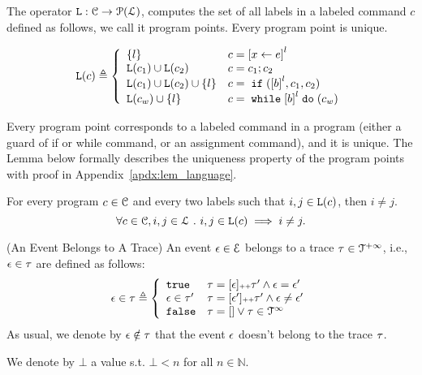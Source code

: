 The operator $\mathtt{L}: \mathcal{C} \to \mathcal{P}(\mathcal{L})$,
computes the set of all labels
in a labeled command $c$ defined as follows, we call it program points.
Every program point is unique.
\begin{defn}
\label{def:progl}
{\small
\[
 \progl(c) \triangleq
 \left\{
 \begin{array}{ll}
 \{l\} 
 & {c} = \clabel{\assign x \expr}^{l} 
 \\
 \progl({c_1}) \cup \progl({{c_2}}) 
 & {c} = {c_1};{c_2}
 \\
 \progl(c_1) \cup \progl({{c_2}}) \cup \{l\} 
 & {c} =\eif(\clabel{\bexpr}^{l}, c_1, c_2) 
 \\
 \progl(c_w) \cup \{l\} 
 & {c} = \ewhile \clabel{\bexpr}^{l} \edo (c_w)
\end{array}
\right.
\]
}
\end{defn}
%
Every program point corresponds to a labeled command in a program (either a guard of if or while command, or an assignment command), and it is unique.
The Lemma below formally describes the uniqueness property of the program points
with proof in Appendix~\ref{apdx:lem_language}.
\begin{lem}
 \label{lem:label_unique}
 For every program $c \in \mathcal{C}$ and every two labels such that
 $i, j \in \mathtt{L}(c)$, then $i \neq j$.
 \[
 \forall c \in \mathcal{C}, i, j \in \mathcal{L} ~.~ i, j \in \mathtt{L}(c)\implies i \neq j.
 \]
\end{lem}
%
\begin{defn}(An Event Belongs to A Trace)
 An event $\mathtt{\epsilon} \in \mathcal{E}$ belongs to a trace $\mathtt{\tau} \in \mathcal{T}^{+\infty}$, i.e., $\mathtt{\epsilon} \in \mathtt{\tau}$ are defined as follows:
%
\begin{equation*}
 \event \in \trace 
 \triangleq \left\{
 \begin{array}{ll} 
 \etrue & \trace = [\event] \tracecat \trace'
 \land \event = \event' \\
 \event \in \trace' & \trace = [\event'] \tracecat \trace'
 \land \event \neq \event' \\ 
 \efalse & \trace = [] \lor \trace \in \inftdom
 \end{array}
 \right.
\end{equation*}
As usual, we denote by $\mathtt{\epsilon} \notin \mathtt{\tau}$ that the event $\mathtt{\epsilon}$ doesn't belong to the trace $\mathtt{\tau}$.
\end{defn}
%
We denote by $\bot$ a value s.t. $\bot < n $ for all $n \in \mathbb{N}$.
